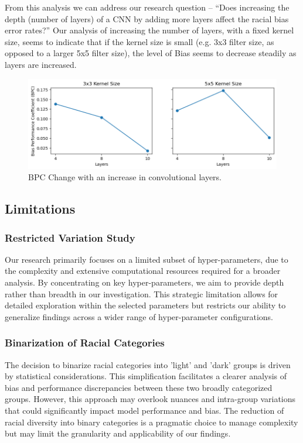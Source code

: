 \documentclass[conference]{IEEEtran}
\begin{document}
From this analysis we can address our research question – “Does increasing the depth (number of layers) of a CNN by adding more layers affect the racial bias error rates?”
Our analysis of increasing the number of layers, with a fixed kernel size, seems to indicate that if the kernel size is small (e.g. 3x3 filter size, as opposed to a larger 5x5 filter size), the level of Bias seems to decrease steadily as layers are increased.

\begin{figure}[hbt!]
    \centerline{\includegraphics[width=0.9\linewidth]{latex/images/bpc_change_combo.png}}
    \caption{BPC Change with an increase in convolutional layers.}
    \label{binarized_data}
\end{figure}

\subsection{Limitations}
\subsubsection{Restricted Variation Study}
Our research primarily focuses on a limited subset of hyper-parameters, due to the complexity and extensive computational resources required for a broader analysis. By concentrating on key hyper-parameters, we aim to provide depth rather than breadth in our investigation. This strategic limitation allows for detailed exploration within the selected parameters but restricts our ability to generalize findings across a wider range of hyper-parameter configurations.
\subsubsection{Binarization of Racial Categories}
The decision to binarize racial categories into 'light' and 'dark' groups is driven by statistical considerations. This simplification facilitates a clearer analysis of bias and performance discrepancies between these two broadly categorized groups. However, this approach may overlook nuances and intra-group variations that could significantly impact model performance and bias. The reduction of racial diversity into binary categories is a pragmatic choice to manage complexity but may limit the granularity and applicability of our findings.
\end{document}
